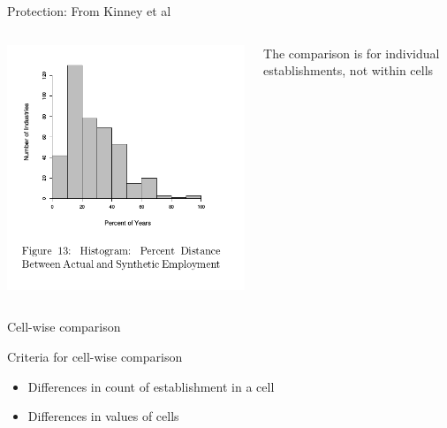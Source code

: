 \begin{frame}{Protection: From Kinney et al}
\begin{columns}
\begin{column}{0.6\textwidth}
\includegraphics[height=0.8\textheight]{CES-WP-11-04-page40-figure13}
\end{column}
\begin{column}{0.3\textwidth}
The comparison is for individual establishments, not within cells
\end{column}
\end{columns}
\end{frame}

\begin{frame}{Cell-wise comparison}
\begin{block}{Criteria for cell-wise comparison}
\begin{itemize}
\item Differences in count of establishment in a cell
\item Differences in values of cells
\end{itemize}
\end{block}

\end{frame}

